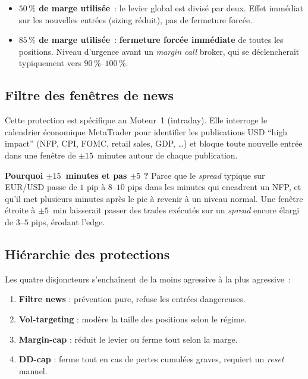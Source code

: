 \documentclass[11pt, a4paper]{scrartcl}
\begin{document}
\begin{itemize}
\item \textbf{$50\,\%$ de marge utilisée}~: le levier global est divisé par deux. Effet immédiat sur les nouvelles entrées (sizing réduit), pas de fermeture forcée.
\item \textbf{$85\,\%$ de marge utilisée}~: \textbf{fermeture forcée immédiate} de toutes les positions. Niveau d'urgence avant un \emph{margin call} broker, qui se déclencherait typiquement vers $90\,\%$--$100\,\%$.
\end{itemize}

\subsection{Filtre des fenêtres de news}

Cette protection est spécifique au Moteur~1 (intraday). Elle interroge le calendrier économique MetaTrader pour identifier les publications USD \enquote{high impact} (NFP, CPI, FOMC, retail sales, GDP, \ldots) et bloque toute nouvelle entrée dans une fenêtre de $\pm 15$~minutes autour de chaque publication.

\begin{examplebox}
\textbf{Pourquoi $\pm 15$~minutes et pas $\pm 5$ ?} Parce que le \emph{spread}
typique sur EUR/USD passe de $1$ pip à $8$--$10$ pips dans les minutes qui
encadrent un NFP, et qu'il met plusieurs minutes après le pic à revenir à un
niveau normal. Une fenêtre étroite à $\pm 5$~min laisserait passer des trades
exécutés sur un \emph{spread} encore élargi de $3$--$5$ pips, érodant l'edge.
\end{examplebox}

\subsection{Hiérarchie des protections}

Les quatre disjoncteurs s'enchaînent de la moins agressive à la plus agressive~:

\begin{enumerate}
\item \textbf{Filtre news} : prévention pure, refuse les entrées dangereuses.
\item \textbf{Vol-targeting} : modère la taille des positions selon le régime.
\item \textbf{Margin-cap} : réduit le levier ou ferme tout selon la marge.
\item \textbf{DD-cap} : ferme tout en cas de pertes cumulées graves, requiert un \emph{reset} manuel.
\end{enumerate}
\end{document}
